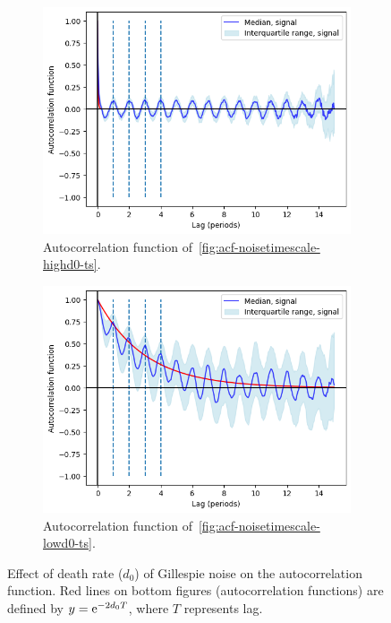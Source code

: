 \begin{figure}
  \begin{subfigure}[t]{0.45\textwidth}
  \centering
    \includegraphics[width=\linewidth]{gillespie_k5_d0p5_acf.png}
    \caption{
      Autocorrelation function of~\ref{fig:acf-noisetimescale-highd0-ts}.
    }
    \label{fig:acf-noisetimescale-highd0-acf}
  \end{subfigure}%
  \begin{subfigure}[t]{0.45\textwidth}
  \centering
    \includegraphics[width=\linewidth]{gillespie_k5_d0p005_acf.png}
    \caption{
      Autocorrelation function of~\ref{fig:acf-noisetimescale-lowd0-ts}.
    }
    \label{fig:acf-noisetimescale-lowd0-acf}
  \end{subfigure}

  \caption{
    Effect of death rate ($d_{0}$) of Gillespie noise on the autocorrelation function.
    Red lines on bottom figures (autocorrelation functions) are defined by $y = \mathrm{e}^{-2d_{0}T}$, where $T$ represents lag.
  }
  \label{fig:acf-noisetimescale}
\end{figure}

